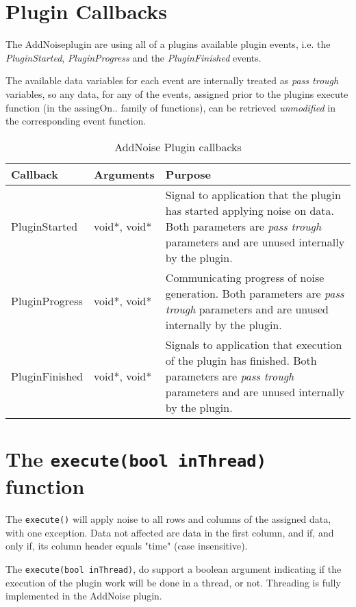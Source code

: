 \section{Plugin Callbacks}
The AddNoiseplugin are using all of a plugins available plugin events, i.e. the \emph{PluginStarted}, \emph{PluginProgress} and the \emph{PluginFinished} events.

The available data variables for each event are internally treated as \emph{pass trough} variables, so any data, for any of the events, assigned prior to 
the plugins execute function (in the assingOn.. family of functions), can be retrieved \emph{unmodified} in the corresponding event function.
\begin{table}[ht]
\centering %
\begin{tabular}{l l p{7.5cm}} %

Callback & Arguments & Purpose \\ [0.5ex] %
\hline %
\hline %
PluginStarted  	& 	void*, void*  & Signal to application that the plugin has started applying noise on data. Both parameters are \emph{pass trough} parameters and are unused internally by the plugin.\\[0.5ex]
PluginProgress	& 	void*, void*  & Communicating progress of noise generation. Both parameters are \emph{pass trough} parameters and are unused internally by the plugin. \\[0.5ex]
PluginFinished	& 	void*, void*  & Signals to application that execution of the plugin has finished. Both parameters are \emph{pass trough} parameters and are unused internally by the plugin.\\

\hline %
\end{tabular}
\caption{AddNoise Plugin callbacks} 
\label{table:AddNoisePluginCallBacks} 
\end{table}

\section{The \texttt{execute(bool inThread)} function}
The \verb|execute()| will apply noise to all rows and columns of the assigned data, with one exception. Data not affected are data in the first column, and if, and only if, its column header equals "time" (case insensitive). 

The \verb|execute(bool inThread)|, do support a boolean argument indicating if the execution of the plugin work will be done in a thread, or not. Threading is fully implemented in the AddNoise plugin.


